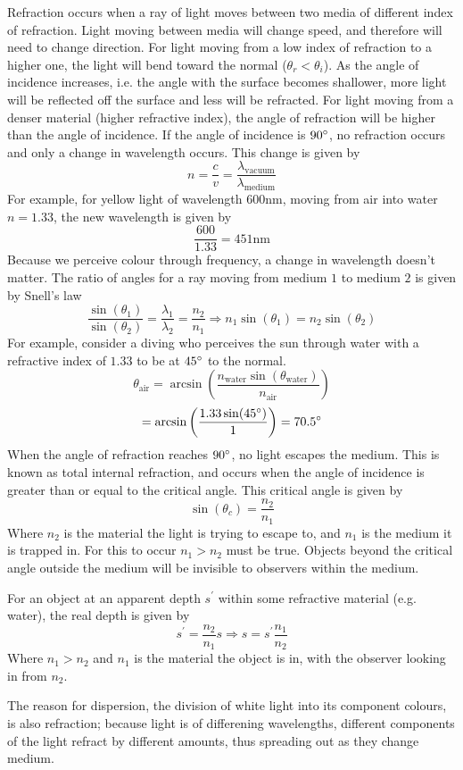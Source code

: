 \documentclass[12pt]{report}
\begin{document}
\begin{flushleft}
\bigskip
Refraction occurs when a ray of light moves between two media of different 
index of refraction. Light moving between media will change speed, and 
therefore will need to change direction. For light moving from a low index of
refraction to a higher one, the light will bend toward the normal 
(\(\theta_r < \theta_i\)). As the angle of incidence increases, i.e. the angle
with the surface becomes shallower, more light will be reflected off the 
surface and less will be refracted. For light moving from a denser material
(higher refractive index), the angle of refraction will be higher than the
angle of incidence. If the angle of incidence is \(90\degree\), no refraction
occurs and only a change in wavelength occurs. This change is given by
\[n = \frac{c}{v} = \frac{\lambda_\mathrm{vacuum}}{\lambda_\mathrm{medium}}\]
For example, for yellow light of wavelength \(600\mathrm{nm}\), moving from
air into water \(n = 1.33\), the new wavelength is given by
\[\frac{600}{1.33} = 451\mathrm{nm}\]
Because we perceive colour through frequency, a change in wavelength doesn't
matter. The ratio of angles for a ray moving from medium \(1\) to medium \(2\)
is given by Snell's law
\[\frac{\sin(\theta_1)}{\sin(\theta_2)} = \frac{\lambda_1}{\lambda_2} 
= \frac{n_2}{n_1} \Rightarrow n_1\sin(\theta_1) = n_2\sin(\theta_2)\]
For example, consider a diving who perceives the sun through water with a
refractive index of \(1.33\) to be at \(45\degree\) to the normal.
\[\theta_\mathrm{air} = \arcsin\left(\frac{n_\mathrm{water}
\sin(\theta_\mathrm{water})}{n_\mathrm{air}}\right)\]
\[= \arcsin\left(\frac{1.33\sin(45\degree)}{1}\right) = 70.5\degree\]
When the angle of refraction reaches \(90\degree\), no light escapes the 
medium. This is known as total internal refraction, and occurs when the
angle of incidence is greater than or equal to the critical angle. This
critical angle is given by
\[\sin(\theta_c) = \frac{n_2}{n_1}\]
Where \(n_2\) is the material the light is trying to escape to, and \(n_1\) is
the medium it is trapped in. For this to occur \(n_1 > n_2\) must be true.
Objects beyond the critical angle outside the medium will be invisible to 
observers within the medium.

\bigskip
For an object at an apparent depth \(s^\prime\) within some refractive material
(e.g. water), the real depth is given by
\[s^\prime = \frac{n_2}{n_1}s \Rightarrow s = s^\prime\frac{n_1}{n_2}\]
Where \(n_1 > n_2\) and \(n_1\) is the material the object is in, with the
observer looking in from \(n_2\).

\bigskip
The reason for dispersion, the division of white light into its component
colours, is also refraction; because light is of differening wavelengths,
different components of the light refract by different amounts, thus spreading
out as they change medium.


\end{flushleft}
\end{document}
